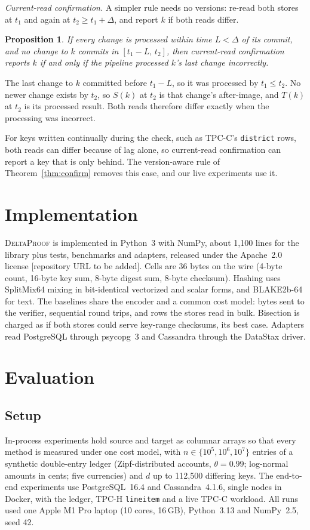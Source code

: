 \documentclass[conference]{IEEEtran}
\newcommand{\sys}{\textsc{DeltaProof}}
\newtheorem{proposition}{Proposition}
\begin{document}
\emph{Current-read confirmation.} A simpler rule needs no versions: re-read both stores at $t_1$ and again at $t_2\ge t_1+\Delta$, and report $k$ if both reads differ.

\begin{proposition}\label{prop:quiet}
If every change is processed within time $L<\Delta$ of its commit, and no change to $k$ commits in $[t_1-L,\,t_2]$, then current-read confirmation reports $k$ if and only if the pipeline processed $k$'s last change incorrectly.
\end{proposition}
\begin{IEEEproof}
The last change to $k$ committed before $t_1-L$, so it was processed by $t_1\le t_2$. No newer change exists by $t_2$, so $S(k)$ at $t_2$ is that change's after-image, and $T(k)$ at $t_2$ is its processed result. Both reads therefore differ exactly when the processing was incorrect.
\end{IEEEproof}

For keys written continually during the check, such as TPC-C's \texttt{district} rows, both reads can differ because of lag alone, so current-read confirmation can report a key that is only behind. The version-aware rule of Theorem~\ref{thm:confirm} removes this case, and our live experiments use it.

\section{Implementation}\label{sec:impl}
\sys{} is implemented in Python~3 with NumPy, about 1{,}100 lines for the library plus tests, benchmarks and adapters, released under the Apache~2.0 license [repository URL to be added]. Cells are 36 bytes on the wire (4-byte count, 16-byte key sum, 8-byte digest sum, 8-byte checksum). Hashing uses SplitMix64 mixing in bit-identical vectorized and scalar forms, and BLAKE2b-64 for text. The baselines share the encoder and a common cost model: bytes sent to the verifier, sequential round trips, and rows the stores read in bulk. Bisection is charged as if both stores could serve key-range checksums, its best case. Adapters read PostgreSQL through psycopg~3 and Cassandra through the DataStax driver.

\section{Evaluation}\label{sec:eval}
\subsection{Setup}
In-process experiments hold source and target as columnar arrays so that every method is measured under one cost model, with $n\in\{10^5,10^6,10^7\}$ entries of a synthetic double-entry ledger (Zipf-distributed accounts, $\theta=0.99$; log-normal amounts in cents; five currencies) and $d$ up to 112{,}500 differing keys. The end-to-end experiments use PostgreSQL~16.4 and Cassandra~4.1.6, single nodes in Docker, with the ledger, TPC-H \texttt{lineitem} and a live TPC-C workload. All runs used one Apple M1 Pro laptop (10 cores, 16\,GB), Python~3.13 and NumPy~2.5, seed 42.
\end{document}
